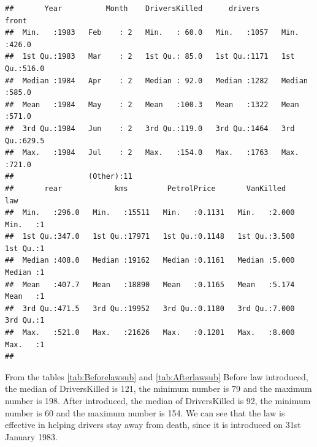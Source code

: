 \documentclass[11pt,a4paper,]{article}
\begin{document}
\begin{verbatim}
##       Year          Month    DriversKilled      drivers         front      
##  Min.   :1983   Feb    : 2   Min.   : 60.0   Min.   :1057   Min.   :426.0  
##  1st Qu.:1983   Mar    : 2   1st Qu.: 85.0   1st Qu.:1171   1st Qu.:516.0  
##  Median :1984   Apr    : 2   Median : 92.0   Median :1282   Median :585.0  
##  Mean   :1984   May    : 2   Mean   :100.3   Mean   :1322   Mean   :571.0  
##  3rd Qu.:1984   Jun    : 2   3rd Qu.:119.0   3rd Qu.:1464   3rd Qu.:629.5  
##  Max.   :1984   Jul    : 2   Max.   :154.0   Max.   :1763   Max.   :721.0  
##                 (Other):11                                                 
##       rear            kms         PetrolPrice       VanKilled          law   
##  Min.   :296.0   Min.   :15511   Min.   :0.1131   Min.   :2.000   Min.   :1  
##  1st Qu.:347.0   1st Qu.:17971   1st Qu.:0.1148   1st Qu.:3.500   1st Qu.:1  
##  Median :408.0   Median :19162   Median :0.1161   Median :5.000   Median :1  
##  Mean   :407.7   Mean   :18890   Mean   :0.1165   Mean   :5.174   Mean   :1  
##  3rd Qu.:471.5   3rd Qu.:19952   3rd Qu.:0.1180   3rd Qu.:7.000   3rd Qu.:1  
##  Max.   :521.0   Max.   :21626   Max.   :0.1201   Max.   :8.000   Max.   :1  
## 
\end{verbatim}

From the tables \ref{tab:Beforelawsub} and \ref{tab:Afterlawsub}
Before law introduced, the median of DriversKilled is 121, the minimum number is 79 and the maximum number is 198. After introduced, the median of DriversKilled is 92, the minimum number is 60 and the maximum number is 154. We can see that the law is effective in helping drivers stay away from death, since it is introduced on 31st January 1983.

\printbibliography
\end{document}

